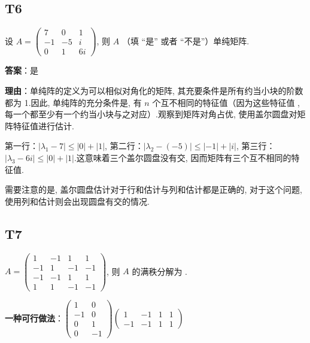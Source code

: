 \documentclass{article}
\begin{document}
\subsection{T6}

\par 设 $A=\begin{pmatrix}
	7 & 0 & 1\\
	-1 & -5 & i\\
	0 & 1 & 6i
\end{pmatrix}$, 则 $A$ \underline{\phantom{empty\_space}}（填 “是” 或者 “不是”）单纯矩阵.

\par \textbf{答案}：是

\par \textbf{理由}：单纯阵的定义为可以相似对角化的矩阵, 其充要条件是所有约当小块的阶数都为 1.因此, 单纯阵的充分条件是, 有 $n$ 个互不相同的特征值（因为这些特征值 , 每一个都至少有一个约当小块与之对应）.观察到矩阵对角占优, 使用盖尔圆盘对矩阵特征值进行估计.

第一行：$|\lambda_1-7|\leq |0| + |1|$, 第二行：$|\lambda_2-(-5)|\leq |-1| + |i|$, 第三行：$|\lambda_3-6i|\leq |0| + |1|$.这意味着三个盖尔圆盘没有交, 因而矩阵有三个互不相同的特征值.

需要注意的是, 盖尔圆盘估计对于行和估计与列和估计都是正确的, 对于这个问题, 使用列和估计则会出现圆盘有交的情况.

\subsection{T7}

\par $A=\begin{pmatrix}
	1 & -1 & 1 & 1\\
	-1 & 1 & -1 & -1\\
	-1 & -1 & 1 & 1\\
	1 & 1 & -1 & -1
\end{pmatrix}$, 则 $A$ 的满秩分解为 \underline{\phantom{empty\_space}}.

\par \textbf{一种可行做法}：$\begin{pmatrix}
	1 & 0\\
	-1 & 0\\
	0 & 1\\
	0 & -1
\end{pmatrix} \begin{pmatrix}
	1 & -1 & 1 & 1\\
	-1 & -1 & 1 & 1
\end{pmatrix}$
\end{document}
